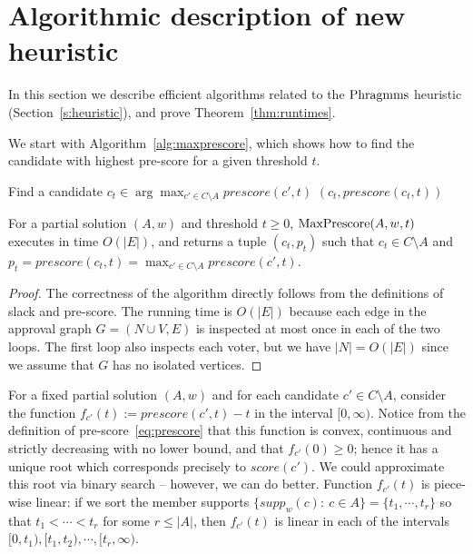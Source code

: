 \section{Algorithmic description of new heuristic}\label{s:algorithms}

In this section we describe efficient algorithms related to the $\operatorname{Phragmms}$ heuristic (Section~\ref{s:heuristic}), and prove Theorem~\ref{thm:runtimes}.

We start with Algorithm~\ref{alg:maxprescore}, which shows how to find the candidate with highest pre-score for a given threshold $t$.

\begin{algorithm}[htb]\label{alg:maxprescore}
\SetAlgoLined
{}
Find a candidate $c_t\in\arg\max_{c'\in C\setminus A} prescore(c', t)$\;
\Return $(c_t, prescore(c_t, t))$\;
 \caption{$\maxprescore(A,w,t)$}
\end{algorithm}

\begin{lemma}
For a partial solution $(A,w)$ and threshold $t\geq 0$, $\maxprescore(A,w,t)$ executes in time $O(|E|)$, 
and returns a tuple $(c_t,p_t)$ such that $c_t\in C\setminus A$ 
and $p_t=prescore(c_t,t)=\max_{c'\in C\setminus A} prescore(c',t)$.
\end{lemma}

\begin{proof}
The correctness of the algorithm directly follows from the definitions of slack and pre-score. The running time is $O(|E|)$ because each edge in the approval graph $G=(N\cup V, E)$ is inspected at most once in each of the two loops. The first loop also inspects each voter, but we have $|N|=O(|E|)$ since we assume that $G$ has no isolated vertices.
\end{proof}


For a fixed partial solution $(A,w)$ and for each candidate $c'\in C\setminus A$, consider the function 
$f_{c'}(t):=prescore(c',t)-t$ in the interval $[0,\infty)$. 
Notice from the definition of pre-score~\eqref{eq:prescore} that this function is convex, continuous and strictly decreasing with no lower bound, and that $f_{c'}(0)\geq 0$; hence it has a unique root which corresponds precisely to $score(c')$. We could approximate this root via binary search -- however, we can do better. 
Function $f_{c'}(t)$ is piece-wise linear: if we sort the member supports $\{supp_w(c): \ c\in A\}=\{t_1, \cdots, t_r\}$ so that $t_1 < \cdots < t_r$ for some $r\leq |A|$, then $f_{c'}(t)$ is linear in each of the intervals $[0, t_1), [t_1, t_2), \cdots, [t_r, \infty)$.

